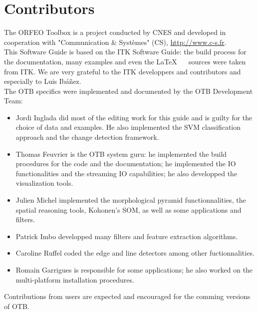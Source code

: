 \chapter*{Contributors}
\noindent

The ORFEO Toolbox is a project conducted by CNES and developed in
cooperation with "Communication \&
  Syst\`{e}mes" (CS), \url{http://www.c-s.fr}.\\

This Software Guide is based on the ITK Software Guide: the build
process for the documentation, many examples and even the \LaTeX~ ~
sources were taken from ITK. We are very grateful to the ITK
developpers and contributors and especially to Luis Ib\'a\~nez.\\

The OTB specifics were implemented and documented by the OTB Development Team:
\begin{itemize}
  \item Jordi Inglada did most of the editing work for this guide and
  is guilty for the choice of data and examples. He also implemented
  the SVM classification approach and the change detection framework.
  \item Thomas Feuvrier is the OTB system guru: he implemented the
  build procedures for the code and the documentation; he implemented
  the IO functionalities and the streaming IO capabilities; he also
  developped the visualization tools.
  \item Julien Michel implemented the morphological pyramid
  functionnalities, the spatial reasoning tools, Kohonen's SOM, as well as some
  applications and filters.
  \item Patrick Imbo developped many filters and feature
  extraction algorithms.
  \item Caroline Ruffel coded the edge and line detectors among other
  fuctionnalities.
  \item Romain Garrigues is responsible for some applications; he also
  worked on the multi-platform installation procedures.
\end{itemize}

Contributions from users are expected and encouraged for the comming
versions of OTB.

